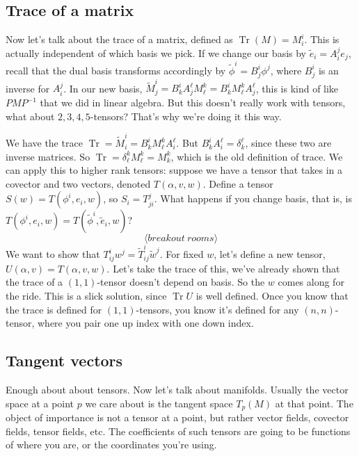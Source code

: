 \subsection{Trace of a matrix}
Now let's talk about the trace of a matrix, defined as $\operatorname{Tr}(M)=M^i _i $. This is actually independent of which basis we pick. If we change our basis by $\widetilde e_i =A_i^j e_j $, recall that the dual basis transforms accordingly by $\widetilde \phi ^i =B_j ^i  \phi^j $, where $B_j ^i $ is an inverse for $A_i^j $. In our new basis, $\widetilde M^i _j =B^i _k A_j ^{\ell}M^k_{\ell}=B^i _k M^k _{\ell}A^{\ell}_j $, this is kind of like $PMP ^{-1}$ that we did in linear algebra. But this doesn't really work with tensors, what about $2,3,4,5$-tensors? That's why we're doing it this way.

We have the trace $\operatorname{Tr}=\widetilde M_i ^i =B^i _k M^k_{\ell}A_i ^{\ell}$. But $B^i _k A_i ^{\ell}=\delta ^{\ell}_k$, since these two are inverse matrices. So $\operatorname{Tr}=\delta _{\ell}^k M^k_{\ell}=M_k^k$, which is the old definition of trace. We can apply this to higher rank tensors: suppose we have a tensor that takes in a covector and two vectors, denoted $T(\alpha ,v,w)$. Define a tensor $S(w)=T(\phi ^i , e_i, w)$, so $S_i =T^j  _{ji}$. What happens if you change basis, that is, is $T(\phi ^i , e_i , w)=T( \widetilde \phi ^i , \widetilde e_i , w)$?
\[
\langle breakout \ rooms \rangle 
\] We want to show that $T^i _{ij}w^j =\widetilde T^i _{ij}\widetilde w^j $. For fixed $w$, let's define a new tensor, $U(\alpha ,v)=T(\alpha ,v,w)$. Let's take the trace of this, we've already shown that the trace of a $(1,1)$-tensor doesn't depend on basis. So the $w$ comes along for the ride. This is a slick solution, since $\operatorname{Tr}U$ is well defined. Once you know that the trace is defined for $(1,1)$-tensors, you know it's defined for any $(n,n)$-tensor, where you pair one up index with one down index.

\subsection{Tangent vectors}
Enough about about tensors. Now let's talk about manifolds. Usually the vector space at a point $p$ we care about is the tangent space $T_p(M)$ at that point. The object of importance is not a tensor at a point, but rather vector fields, covector fields, tensor fields, etc. The coefficients of such tensors are going to be functions of where you are, or the coordinates you're using. 


